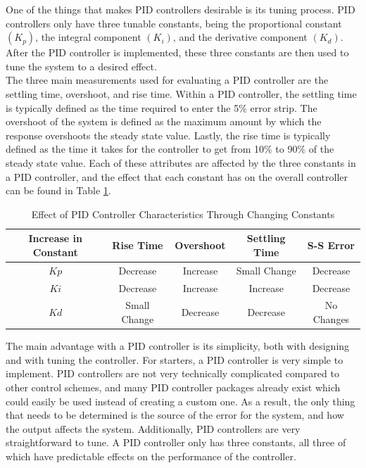 \documentclass[titlepage,draft]{article}
\begin{document}
{\indent One of the things that makes PID controllers desirable is its tuning process. PID controllers only have three tunable constants, being the proportional constant \((K_p)\), the integral component \((K_i)\), and the derivative component \((K_d)\). After the PID controller is implemented, these three constants are then used to tune the system to a desired effect. \cite{pid_advantages}\\
\indent The three main measurements used for evaluating a PID controller are the settling time, overshoot, and rise time. Within a PID controller, the settling time is typically defined as the time required to enter the 5\% error strip. The overshoot of the system is defined as the maximum amount by which the response overshoots the steady state value. Lastly, the rise time is typically defined as the time it takes for the controller to get from 10\% to 90\% of the steady state value. Each of these attributes are affected by the three constants in a PID controller, and the effect that each constant has on the overall controller can be found in Table \ref{tab:pidvals}.

\begin{table}[H]
	\centering
	\caption{Effect of PID Controller Characteristics Through Changing Constants \cite{pid_characteristics}}
	\begin{tabular}{|c | c | c | c | c |}
		\hline
		Increase in Constant & Rise Time    & Overshoot & Settling Time & S-S Error  \\ [0.5ex]
		\hline
		\(Kp\)               & Decrease     & Increase  & Small Change  & Decrease   \\
		\hline
		\(Ki\)               & Decrease     & Increase  & Increase      & Decrease   \\
		\hline
		\(Kd\)               & Small Change & Decrease  & Decrease      & No Changes \\
		\hline
	\end{tabular}
	\label{tab:pidvals}
\end{table}

The main advantage with a PID controller is its simplicity, both with designing and with tuning the controller. For starters, a PID controller is very simple to implement. PID controllers are not very technically complicated compared to other control schemes, and many PID controller packages already exist which could easily be used instead of creating a custom one. As a result, the only thing that needs to be determined is the source of the error for the system, and how the output affects the system. Additionally, PID controllers are very straightforward to tune. A PID controller only has three constants, all three of which have predictable effects on the performance of the controller.

}
\end{document}
